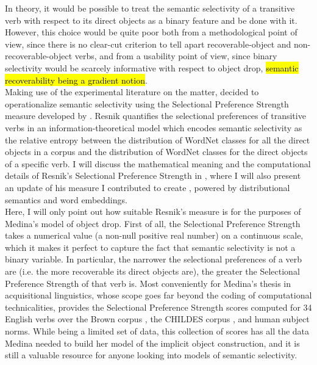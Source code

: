 In theory, it would be possible to treat the semantic selectivity of a transitive verb with respect to its direct objects as a binary feature and be done with it. However, this choice would be quite poor both from a methodological point of view, since there is no clear-cut criterion to tell apart recoverable-object and non-recoverable-object verbs, and from a usability point of view, since binary selectivity would be scarcely informative with respect to object drop, \hl{semantic recoverability being a gradient notion}.\\
Making use of the experimental literature on the matter, \textcite{Medina2007} decided to operationalize semantic selectivity using the Selectional Preference Strength measure developed by \textcite{Resnik1993, Resnik1996}. Resnik quantifies the selectional preferences of transitive verbs in an information-theoretical model which encodes semantic selectivity as the relative entropy between the distribution of WordNet \parencite{beckwith1991wordnet, Miller1995} classes for all the direct objects in a corpus and the distribution of WordNet classes for the direct objects of a specific verb. I will discuss the mathematical meaning and the computational details of Resnik's Selectional Preference Strength in , where I will also present an update of his measure I contributed to create \parencite{CappelliLenciPISA}, powered by distributional semantics and word embeddings.\\
Here, I will only point out how suitable Resnik's measure is for the purposes of Medina's model of object drop. First of all, the Selectional Preference Strength takes a numerical value (a non-null positive real number) on a continuous scale, which it makes it perfect to capture the fact that semantic selectivity is not a binary variable. In particular, the narrower the selectional preferences of a verb are (i.e. the more recoverable its direct objects are), the greater the Selectional Preference Strength of that verb is. Most conveniently for Medina's thesis in acquisitional linguistics, whose scope goes far beyond the coding of computational technicalities, \textcite[150]{Resnik1996} provides the Selectional Preference Strength scores computed for 34 English verbs over the Brown corpus \parencite{kucera1967brownCorpus}, the CHILDES corpus \parencite{macwhinney2000childesCorpus}, and human subject norms. While being a limited set of data, this collection of scores has all the data Medina needed to build her model of the implicit object construction, and it is still a valuable resource for anyone looking into models of semantic selectivity.


